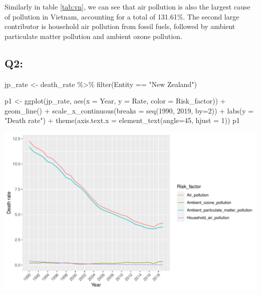 \documentclass[11pt,a4paper,]{article}
\newenvironment{Shaded}{\begin{snugshade}}{\end{snugshade}}
\newcommand{\AttributeTok}[1]{\textcolor[rgb]{0.77,0.63,0.00}{#1}}
\newcommand{\DecValTok}[1]{\textcolor[rgb]{0.00,0.00,0.81}{#1}}
\newcommand{\FunctionTok}[1]{\textcolor[rgb]{0.00,0.00,0.00}{#1}}
\newcommand{\NormalTok}[1]{#1}
\newcommand{\OtherTok}[1]{\textcolor[rgb]{0.56,0.35,0.01}{#1}}
\newcommand{\SpecialCharTok}[1]{\textcolor[rgb]{0.00,0.00,0.00}{#1}}
\newcommand{\StringTok}[1]{\textcolor[rgb]{0.31,0.60,0.02}{#1}}
\begin{document}
Similarly in table \ref{tab:vn}, we can see that air pollution is also the largest cause of pollution in Vietnam, accounting for a total of 131.61\%. The second large contributor is household air pollution from fossil fuels, followed by ambient particulate matter pollution and ambient ozone pollution.

\hypertarget{q2}{%
\subsection{Q2:}\label{q2}}

\begin{Shaded}
\begin{Highlighting}[]
\NormalTok{jp\_rate }\OtherTok{\textless{}{-}}\NormalTok{ death\_rate }\SpecialCharTok{\%\textgreater{}\%}
  \FunctionTok{filter}\NormalTok{(Entity }\SpecialCharTok{==} \StringTok{"New Zealand"}\NormalTok{)}

\NormalTok{p1 }\OtherTok{\textless{}{-}} \FunctionTok{ggplot}\NormalTok{(jp\_rate, }\FunctionTok{aes}\NormalTok{(}\AttributeTok{x =}\NormalTok{ Year, }\AttributeTok{y =}\NormalTok{ Rate, }\AttributeTok{color =}\NormalTok{ Risk\_factor)) }\SpecialCharTok{+}
  \FunctionTok{geom\_line}\NormalTok{() }\SpecialCharTok{+}
  \FunctionTok{scale\_x\_continuous}\NormalTok{(}\AttributeTok{breaks =} \FunctionTok{seq}\NormalTok{(}\DecValTok{1990}\NormalTok{, }\DecValTok{2019}\NormalTok{, }\AttributeTok{by=}\DecValTok{2}\NormalTok{)) }\SpecialCharTok{+}
  \FunctionTok{labs}\NormalTok{(}\AttributeTok{y =} \StringTok{"Death rate"}\NormalTok{) }\SpecialCharTok{+}
  \FunctionTok{theme}\NormalTok{(}\AttributeTok{axis.text.x =} \FunctionTok{element\_text}\NormalTok{(}\AttributeTok{angle=}\DecValTok{45}\NormalTok{, }\AttributeTok{hjust =} \DecValTok{1}\NormalTok{))}
\NormalTok{p1}
\end{Highlighting}
\end{Shaded}

\includegraphics{Assignment4_files/figure-latex/rate-1.pdf}
\end{document}
